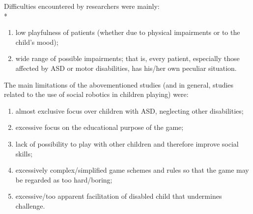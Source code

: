 \documentclass[a4paper,twoside]{book}
\begin{document}
\beforelist Difficulties encountered by researchers were mainly:\\*
\begin{enumerate}
\item low playfulness of patients (whether due to physical impairments or to the child's mood);
\item wide range of possible impairments; that is, every patient, especially those affected by ASD or motor disabilities, has his/her own peculiar situation.
\end{enumerate}
\afterlist*
\beforelist* The main limitations of the above\textendash mentioned studies (and in general, studies related to the use of social robotics in children playing) were:
\begin{enumerate}
\item almost exclusive focus over children with ASD, neglecting other disabilities;
\item excessive focus on the educational purpose of the game;
\item lack of possibility to play with other children and therefore improve social skills;
\item excessively complex/simplified game schemes and rules so that the game may be regarded as too hard/boring;
\item excessive/too apparent facilitation of disabled child that undermines challenge.
\end{enumerate}
\afterlist*
\end{document}
